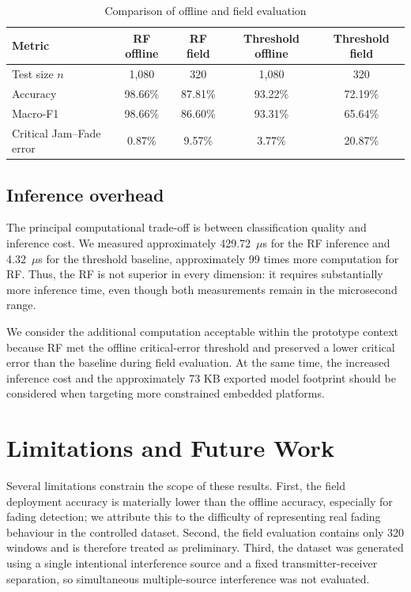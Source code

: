 \documentclass[10pt,a4paper]{article}
\begin{document}
\begin{table}[htbp]
\centering
\caption{Comparison of offline and field evaluation}
\label{tab:results}
\fontsize{8}{9.2}\selectfont
\begin{tabular}{lcccc}
\toprule
\textbf{Metric} & \textbf{RF offline} & \textbf{RF field} & \textbf{Threshold offline} & \textbf{Threshold field} \\
\midrule
Test size $n$ & 1,080 & 320 & 1,080 & 320 \\
Accuracy & 98.66\% & 87.81\% & 93.22\% & 72.19\% \\
Macro-F1 & 98.66\% & 86.60\% & 93.31\% & 65.64\% \\
Critical Jam--Fade error & 0.87\% & 9.57\% & 3.77\% & 20.87\% \\
\bottomrule
\end{tabular}
\end{table}

\subsection{Inference overhead}
The principal computational trade-off is between classification quality and inference cost. We measured approximately 429.72~$\mu$s for the RF inference and 4.32~$\mu$s for the threshold baseline, approximately 99 times more computation for RF. Thus, the RF is not superior in every dimension: it requires substantially more inference time, even though both measurements remain in the microsecond range.


We consider the additional computation acceptable within the prototype context because RF met the offline critical-error threshold and preserved a lower critical error than the baseline during field evaluation. At the same time, the increased inference cost and the approximately 73 KB exported model footprint should be considered when targeting more constrained embedded platforms.

\section{Limitations and Future Work}
Several limitations constrain the scope of these results. First, the field deployment accuracy is materially lower than the offline accuracy, especially for fading detection; we attribute this to the difficulty of representing real fading behaviour in the controlled dataset. Second, the field evaluation contains only 320 windows and is therefore treated as preliminary. Third, the dataset was generated using a single intentional interference source and a fixed transmitter-receiver separation, so simultaneous multiple-source interference was not evaluated.
\end{document}

